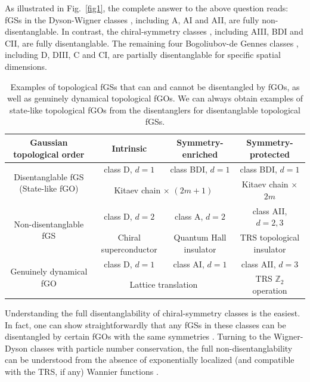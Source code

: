 \documentclass[prl,twocolumn,preprintnumbers,superscriptaddress,amsmath,amssymb]{revtex4-1}
\begin{document}
As illustrated in Fig.~\ref{fig1}, the complete answer to the above question reads: fGSs in the Dyson-Wigner classes \cite{Dyson1962}, including A, AI and AII, are fully non-disentanglable. In contrast, the chiral-symmetry classes \cite{Verbaarschot1994}, including AIII, BDI and CII, are fully disentanglable. The remaining four Bogoliubov-de Gennes classes \cite{Altland1997}, including D, DIII, C and CI, are partially disentanglable for specific spatial dimensions. %

\begin{table}[tbp]
\caption{Examples of topological fGSs that can and cannot be disentangled by fGOs, as well as genuinely dynamical topological fGOs. We can always obtain examples of state-like topological fGOs from the disentanglers for disentanglable topological fGSs.} 
\begin{center}
\begin{tabular}{cccc}
\hline\hline
\;\;\;\;\;\;\;\;Gaussian topological order\;\;\;\;\;\;\;\; & \;\;\;\;\;\;\;\;\;\;\;\;Intrinsic\;\;\;\;\;\;\;\;\;\;\;\; & \;\;\;\;\;\;\;\;\;\;\;\;Symmetry-enriched\;\;\;\;\;\;\;\;\;\;\;\; & \;\;\;\;\;\;\;\;\;\;\;\;Symmetry-protected\;\;\;\;\;\;\;\;\;\;\;\;  \\
\hline
\multirow{2}{*}{Disentanglable fGS (State-like fGO)} & class D, $d=1$ & class BDI, $d=1$ & class BDI, $d=1$ \\
& \multicolumn{2}{c}{Kitaev chain $\times$ $(2m+1)$} & Kitaev chain $\times$ $2m$ \\
\hline
\multirow{2}{*}{Non-disentanglable fGS} & class D, $d=2$ & class A, $d=2$ & class AII, $d=2,3$ \\
& Chiral superconductor & Quantum Hall insulator & TRS topological insulator \\
\hline
\multirow{2}{*}{Genuinely dynamical fGO} & class D, $d=1$ & class AI, $d=1$ & class AII, $d=3$ \\
&\multicolumn{2}{c}{Lattice translation} & TRS $\mathbb{Z}_2$ operation \\
\hline\hline
\end{tabular}
\end{center}
\label{table2}
\end{table}

Understanding the full disentanglability of chiral-symmetry classes is the easiest. In fact, one can show straightforwardly that any fGSs in these classes can be disentangled by certain fGOs with the same symmetries \cite{SM}. Turning to the Wigner-Dyson classes with particle number conservation, the full non-disentanglability can be understood from the absence of exponentially localized (and compatible with the TRS, if any) Wannier functions \cite{Marzari2007,Vanderbilt2011}. 
\end{document}
